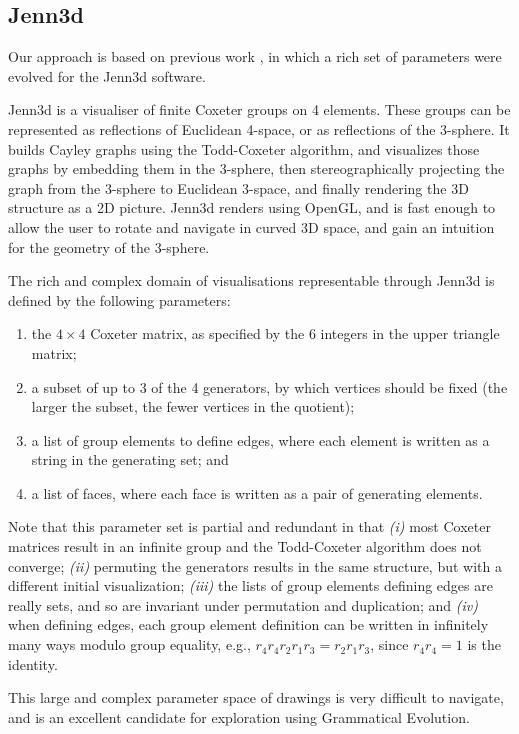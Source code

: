\documentclass{article}
\begin{document}
\subsection{Jenn3d}
Our approach is based on previous work \cite{nicolau2011a}, in which a rich set
of parameters were evolved for the Jenn3d software.

Jenn3d is a visualiser of finite Coxeter groups on 4 elements.  These groups
can be represented as
reflections of Euclidean 4-space, or as reflections of the 3-sphere.  It
builds Cayley graphs using the Todd-Coxeter algorithm, and visualizes those graphs
by embedding them in the 3-sphere, then stereographically projecting the
graph from the 3-sphere to Euclidean 3-space, and finally rendering the 3D structure
as a 2D picture. Jenn3d renders using OpenGL, and is fast enough to allow the
user to rotate and navigate in curved 3D space, and gain an intuition for the
geometry of the 3-sphere.

The rich and complex domain of visualisations representable through Jenn3d is
defined by the following parameters:
\begin{enumerate}
\item the $4\times 4$ Coxeter matrix, as specified by the 6 integers in the
upper triangle matrix;
\item a subset of up to 3 of the 4 generators, by which vertices should be
fixed (the larger the subset, the fewer vertices in the quotient);
\item a list of group elements to define edges,
where each element is written as a string in the generating set; and
\item a list of faces, where each face is written as a pair of generating
elements.
\end{enumerate}
Note that this parameter set is partial and redundant in that
\emph{(i)} most Coxeter matrices result in an infinite group
and the Todd-Coxeter algorithm does not converge;
\emph{(ii)} permuting the generators results in the same structure,
but with a different initial visualization;
\emph{(iii)} the lists of group elements defining edges are really sets,
and so are invariant under permutation and duplication; and
\emph{(iv)} when defining edges, each group element definition can be written
in infinitely many ways modulo group equality, e.g.,
$r_4r_4r_2r_1r_3=r_2r_1r_3$, since $r_4r_4=1$ is the identity.

This large and complex parameter space of drawings is very difficult to
navigate, and is an excellent candidate for exploration using Grammatical
Evolution.
\end{document}
